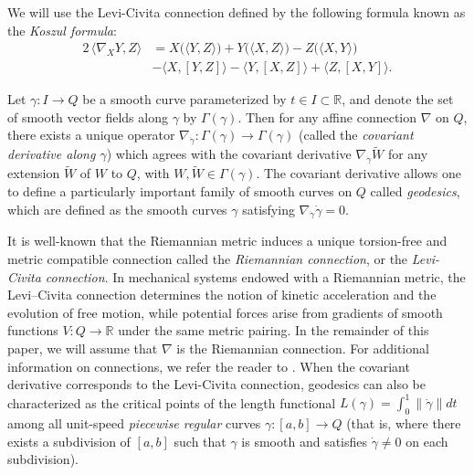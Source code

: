\documentclass[letterpaper, 10 pt, conference]{ieeeconf}
\newcommand{\R}{\mathbb{R}}
\begin{document}
We will use the Levi-Civita connection defined by the following formula known as the \textit{Koszul formula}:
\begin{align}\label{eq:Koszul}
2 \, \langle \nabla_X Y , Z \rangle 
&= X \big( \langle Y , Z \rangle \big)
 + Y \big( \langle X , Z \rangle \big)
 - Z \big( \langle X , Y \rangle \big) \nonumber \\
& - \langle X , [Y,Z] \rangle
 - \langle Y , [X,Z] \rangle
 + \langle Z , [X,Y] \rangle .
\end{align}

Let $\gamma: I \to Q$ be a smooth curve parameterized by $t \in I \subset \R$, and denote the set of smooth vector fields along $\gamma$ by $\Gamma(\gamma)$. Then for any affine connection $\nabla$ on $Q$, there exists a unique operator $\nabla_{\dot{\gamma}}: \Gamma(\gamma) \to \Gamma(\gamma)$ (called the \textit{covariant derivative along $\gamma$}) which agrees with the covariant derivative $\nabla_{\dot{\gamma}}\tilde{W}$ for any extension $\tilde{W}$ of $W$ to $Q$, with $W,\tilde{W}\in\Gamma(\gamma)$. %
 The covariant derivative allows  one to define a particularly important family of smooth curves on $Q$ called \textit{geodesics}, which are defined as the smooth curves $\gamma$ satisfying $\nabla_{\dot{\gamma}} \dot{\gamma} = 0$. 

It is well-known that the Riemannian metric induces a unique torsion-free and metric compatible connection called the \textit{Riemannian connection}, or the \textit{Levi-Civita connection}. In mechanical systems endowed with a Riemannian metric, the Levi–Civita 
connection determines the notion of kinetic acceleration and the evolution 
of free motion, while potential forces arise from gradients of smooth 
functions $V:Q\to\mathbb{R}$ under the same metric pairing. In the remainder of this paper, we will assume that $\nabla$ is the Riemannian connection. For additional information on connections, we refer the reader to \cite{Boothby,Milnor}. When the covariant derivative corresponds to the Levi-Civita connection, geodesics can also be characterized as the critical points of the length functional $\displaystyle{L(\gamma) = \int_0^1 \|\dot{\gamma}\|dt}$ among all unit-speed \textit{piecewise regular} curves $\gamma: [a, b] \to Q$ (that is, where there exists a subdivision of $[a, b]$ such that $\gamma$ is smooth and satisfies $\dot{\gamma} \ne 0$ on each subdivision). 
\end{document}
